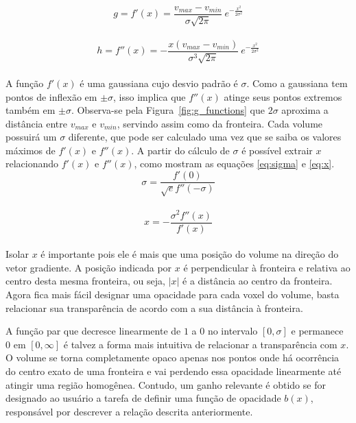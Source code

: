 \begin{equation} \label{eq:first}
	g = f'(x) = \frac{v_{max} - v_{min}}{\sigma\sqrt{2\pi}}\ e^{-\frac{x^{2}}{2\sigma^{2}}}
\end{equation} \\

\begin{equation} \label{eq:second}
	h = f''(x) = -\frac{x(v_{max} - v_{min})}{\sigma^{3}\sqrt{2\pi}}\ e^{-\frac{x^{2}}{2\sigma^{2}}}
\end{equation} \\

	A função $f'(x)$ é uma gaussiana cujo desvio padrão é $\sigma$. Como a gaussiana tem pontos de inflexão em $\pm\sigma$, isso implica que $f''(x)$ atinge seus pontos extremos também em $\pm\sigma$. Observa-se pela Figura~\ref{fig:g_functions} que $2\sigma$ aproxima a distância entre $v_{max}$ e $v_{min}$, servindo assim como  da fronteira. Cada volume possuirá um $\sigma$ diferente, que pode ser calculado uma vez que se saiba os valores máximos de $f'(x)$ e $f''(x)$. A partir do cálculo de $\sigma$ é possível extrair $x$ relacionando $f'(x)$ e $f''(x)$, como mostram as equações \eqref{eq:sigma} e \eqref{eq:x}.
	\\
	
\begin{equation} \label{eq:sigma}
	\sigma = \frac{f'(0)}{\sqrt{e}f''(-\sigma)}
\end{equation} \\

\begin{equation} \label{eq:x}
	x = -\frac{\sigma^{2}f''(x)}{f'(x)}
\end{equation} \\

	Isolar $x$ é importante pois ele é mais que uma posição do volume na direção do vetor gradiente. A posição indicada por $x$ é perpendicular à fronteira e relativa ao centro desta mesma fronteira, ou seja, $|x|$ é a distância ao centro da fronteira. Agora fica mais fácil designar uma opacidade para cada voxel do volume, basta relacionar sua transparência de acordo com a sua distância à fronteira.
	
	A função par que decresce linearmente de $1$ a $0$ no intervalo $[0,\sigma]$ e permanece $0$ em $[0, \infty]$ é talvez a forma mais intuitiva de relacionar a transparência com $x$. O volume se torna completamente opaco apenas nos pontos onde há ocorrência do centro exato de uma fronteira e vai perdendo essa opacidade linearmente até atingir uma região homogênea. Contudo, um ganho relevante é obtido se for designado ao usuário a tarefa de definir uma função de opacidade $b(x)$, responsável por descrever a relação  descrita anteriormente.
	
